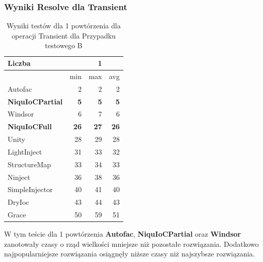 \documentclass[12pt]{article}
\begin{document}
\subsubsection{Wyniki Resolve dla Transient}
\begin{table}[H]
\captionsetup{belowskip=0pt,aboveskip=0pt}
\begin{center}
\begin{small}
	\begin{tabular}{ | l | r r r | }
    		\hline
Liczba & & 1 & \\ \hline
 & min & max & avg \\ \hline
Autofac & 2 & 2 & 2 \\ \hline
\textbf{NiquIoCPartial} & \textbf{5} & \textbf{5} & \textbf{5} \\ \hline
Windsor & 6 & 7 & 6 \\ \hline
\textbf{NiquIoCFull} & \textbf{26} & \textbf{27} & \textbf{26} \\ \hline
Unity & 28 & 29 & 28 \\ \hline
LightInject & 31 & 33 & 32 \\ \hline
StructureMap & 33 & 34 & 33 \\ \hline
Ninject & 36 & 38 & 36 \\ \hline
SimpleInjector & 40 & 41 & 40 \\ \hline
DryIoc & 43 & 44 & 43 \\ \hline
Grace & 50 & 59 & 51 \\ \hline
  	\end{tabular}
\end{small}
\end{center}
\caption{Wyniki testów dla 1 powtórzenia dla operacji Transient dla Przypadku testowego B}
\label{TestCaseB_Transient1}
\end{table}
W tym teście dla 1 powtórzenia \textbf{Autofac}, \textbf{NiquIoCPartial} oraz \textbf{Windsor} zanotowały czasy o rząd wielkości mniejsze niż pozostałe rozwiązania. Dodatkowo najpopularniejsze rozwiązania osiągnęły niższe czasy niż najszybsze rozwiązania.
\\ \\
\end{document}
